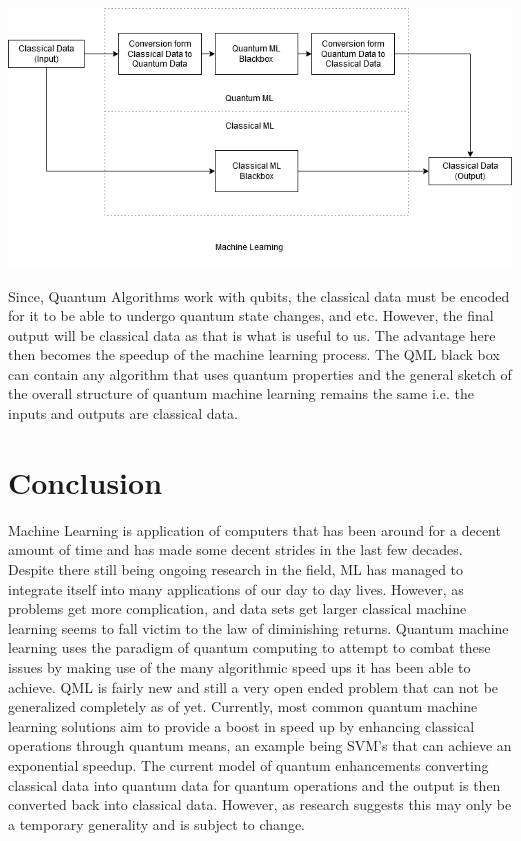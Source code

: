 \documentclass{article}
\begin{document}
\begin{center}
    \includegraphics[scale = 0.5]{images/qmldiag.png}
\end{center}
\par
Since, Quantum Algorithms work with qubits, the classical data must be encoded for it to be able to undergo quantum state changes, and etc. However, the final output will be classical data as that is what is useful to us. The advantage here then becomes the speedup of the machine learning process. The QML black box can contain any algorithm that uses quantum properties and the general sketch of the overall structure of quantum machine learning remains the same i.e. the inputs and outputs are classical data. \cite{article4}

\section{Conclusion}
\par
Machine Learning is application of computers that has been around for a decent amount of time and has made some decent strides in the last few decades. Despite there still being ongoing research in the field, ML has managed to integrate itself into many applications of our day to day lives. However, as problems get more complication, and data sets get larger classical machine learning seems to fall victim to the law of diminishing returns. Quantum machine learning uses the paradigm of quantum computing to attempt to combat these issues by making use of the many algorithmic speed ups it has been able to achieve. QML is fairly new and still a very open ended problem that can not be generalized completely as of yet. Currently, most common quantum machine learning solutions aim to provide a boost in speed up by enhancing classical operations through quantum means, an example being SVM's that can achieve an exponential speedup. The current model of quantum enhancements converting classical data into quantum data for quantum operations and the output is then converted back into classical data. However, as research suggests this may only be a temporary generality and is subject to change.
\newpage




\end{document}
